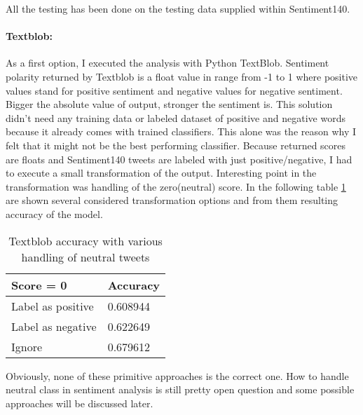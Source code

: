 All the testing has been done on the testing data supplied within Sentiment140.

\paragraph{Textblob:}
As a first option, I executed the analysis with Python TextBlob. Sentiment polarity returned by Textblob is a float value in range from -1 to 1 where positive values stand for positive sentiment and negative values for negative sentiment. Bigger the absolute value of output, stronger the sentiment is. This solution didn't need any training data or labeled dataset of positive and negative words because it already comes with trained classifiers. This alone was the reason why I felt that it might not be the best performing classifier. Because returned scores are floats and Sentiment140 tweets are labeled with just positive/negative, I had to execute a small transformation of the output. Interesting point in the transformation was handling of the zero(neutral) score. In the following table \ref{table:TextblobNeutralTweetResolvingResults} are shown several considered transformation options and from them resulting accuracy of the model. 

\begin{table}[H]
\centering
\begin{tabular}{ |p{3cm}||p{3cm}|}
 \hline
\textbf{ Score = 0 }& \textbf{Accuracy}\\
 \hline
 Label as positive   & 0.608944\\ \hline
 Label as negative & 0.622649\\ \hline
 Ignore & 0.679612\\ \hline 
\end{tabular}
\caption{Textblob accuracy with various handling of neutral tweets}
\label{table:TextblobNeutralTweetResolvingResults}
\end{table}

Obviously, none of these primitive approaches is the correct one. How to handle neutral class in sentiment analysis is still pretty open question and some possible approaches will be discussed later.


